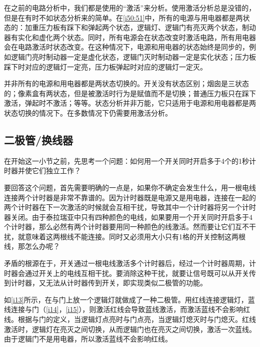 \begin{example}[改进自动门]
在之前的电路分析中，我们都是使用的“激活”来分析。使用激活分析总是没错的，但是在有时不如状态分析来的简单。在\autoref{i50:51}中，所有的电源与用电器都是两状态的：加重压力板有踩下和弹起两个状态，逻辑灯、逻辑门有亮灭两个状态，制动器有实化和虚化两个状态。同时，所有电源会在状态改变时激活电路，所有用电器会在电路激活时状态改变。在这种情况下，电源和用电器的状态始终是同步的，例如逻辑门亮时制动器一定是虚化状态，逻辑门灭时制动器一定是实化状态；压力板踩下时对应的逻辑灯一定亮，压力板弹起时对应的逻辑灯一定灭。
\begin{remark}
并非所有的电源和用电器都是两状态切换的。开关没有状态区别；烟囱是三状态的；像素盒有两状态，但是被激活时行为是赋值而不是切换；普通压力板只在踩下激活，弹起时不激活；等等。状态分析并非万能，它只适用于电源和用电器都是两状态切换的情况下。在多数情况下仍需要用激活分析。
\end{remark}
\end{example}

\subsection{二极管/换线器}

在开始这一小节之前，先思考一个问题：如何用一个开关同时开启多于4个的1秒计时器并使它们独立工作？

要回答这个问题，首先需要明确的一点是，如果你不确定会发生什么，用一根电线连接两个计时器是非常不靠谱的。因为计时器既是电源又是用电器，连接在一起的两个计时器在下一次激活的时候就会互相干扰，导致其中一个计时器将另一个计时器关闭。由于泰拉瑞亚中只有四种颜色的电线，如果要用一个开关同时开启多于4个计时器，那么必然有两个计时器要用同一种颜色的线激活。然而要让它们互不干扰，就意味着这两根线不能连接。同时又必须用大小只有1格的开关控制这两根线，那怎么办呢？

矛盾的根源在于，开关通过一根电线激活多个计时器后，经过一个计时器周期，计时器会通过开关上的电线互相干扰。要消除这种干扰，就要让信号既可以从开关传到计时器，又无法从计时器传到开关，即实现类似二极管的功能。

如\autoref{i13}所示，在与门上放一个逻辑灯就做成了一种二极管。用红线连接逻辑灯，蓝线连接与门（\autoref{i14}，\autoref{i15}），则激活红线会导致蓝线激活，而激活蓝线不会影响红线。根据与门的定义，当逻辑灯点亮时与门点亮，当逻辑灯熄灭时与门熄灭。红线激活时，逻辑灯在亮灭之间切换，从而逻辑门也在亮灭之间切换，激活一次蓝线。由于逻辑门不是用电器，所以激活蓝线不会影响红线。

